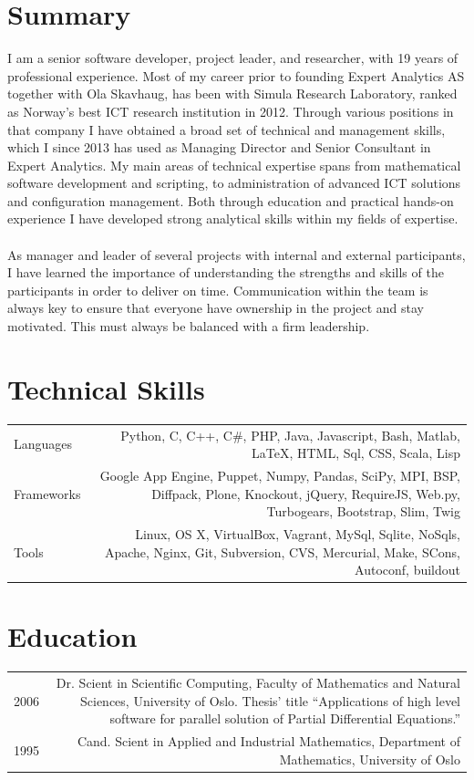 \documentclass[english,a4paper,11pt]{article}
\begin{document}
\section*{Summary}
I am a senior software developer, project leader, and researcher, with 19 years
of professional experience.
Most of my
career prior to founding Expert Analytics AS together with Ola Skavhaug,
has been with Simula Research Laboratory,
ranked as Norway's best ICT research institution in 2012. Through various
positions in that company I have obtained a broad set of technical and management
skills, which I since 2013 has used as Managing Director and Senior Consultant
in Expert Analytics. My main areas of technical expertise spans from mathematical
software development and scripting, to administration of advanced ICT
solutions and configuration management. Both through education and
practical hands-on experience I have developed strong analytical skills within
my fields of expertise.
\\
\\
As manager and leader of several projects with internal and external
participants, I have learned the importance of understanding the strengths and
skills of the participants in order to deliver on time. Communication within
the team is always key to ensure that everyone have ownership in the project and
stay motivated. This must always be balanced with a firm leadership.


\section*{Technical Skills}
\begin{tabular}{LR}
Languages & Python, C, C++, C\#, PHP, Java, Javascript, Bash, Matlab, \LaTeX, HTML, Sql, CSS, Scala, Lisp \\
Frameworks & Google App Engine, Puppet, Numpy, Pandas, SciPy, MPI, BSP, Diffpack, Plone, Knockout, jQuery, RequireJS, Web.py, Turbogears, Bootstrap, Slim, Twig\\
Tools & Linux, OS X, VirtualBox, Vagrant, MySql, Sqlite, NoSqls, Apache, Nginx, Git, Subversion, CVS, Mercurial, Make, SCons, Autoconf, buildout
\end{tabular}

\section*{Education}
\begin{tabular}{LR}
2006 & Dr. Scient in Scientific Computing, Faculty of Mathematics and Natural Sciences, University of Oslo. Thesis' title ``Applications of high level software for parallel solution of Partial Differential Equations.'' \\
1995 & Cand. Scient in Applied and Industrial Mathematics, Department of Mathematics, University of Oslo
\end{tabular}
\end{document}
